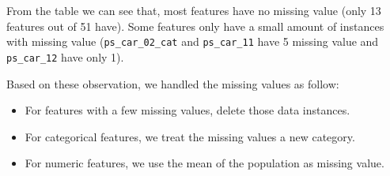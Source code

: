 \documentclass{standalone}
\begin{document}
From the table we can see that, most features have no missing value (only 13 features out of 51 have).
Some features only have a small amount of instances with missing value (\lstinline{ps_car_02_cat} and \lstinline{ps_car_11} have 5 missing value and \lstinline{ps_car_12} have only 1).

Based on these observation, we handled the missing values as follow:

\begin{itemize}
    \item For features with a few missing values, delete those data instances.
    \item For categorical features, we treat the missing values a new category.
    \item For numeric features, we use the mean of the population as missing value.
\end{itemize}
\end{document}
